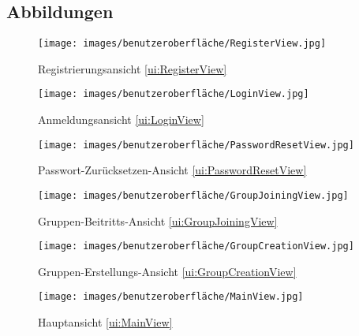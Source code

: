 \documentclass[parskip=full]{scrartcl}
\begin{document}
\subsection*{Abbildungen}
\begin{figure}[htp]
    \begin{minipage}
        [t]{0.49\textwidth}
        \centering
        \texttt{[image: images/benutzeroberfläche/RegisterView.jpg]}
        \caption{Registrierungsansicht \ref{ui:RegisterView}}
        \label{fig:RegisterView}
    \end{minipage}
    \begin{minipage}
        [t]{0.49\textwidth}
        \centering
        \texttt{[image: images/benutzeroberfläche/LoginView.jpg]}
        \caption{Anmeldungsansicht \ref{ui:LoginView}}
        \label{fig:LoginView}
    \end{minipage}
\end{figure}
\begin{figure}[htp]
    \begin{minipage}
        [t]{0.49\textwidth}
        \centering
        \texttt{[image: images/benutzeroberfläche/PasswordResetView.jpg]}
        \caption{Passwort-Zurücksetzen-Ansicht \ref{ui:PasswordResetView}}
        \label{fig:PasswordResetView}
    \end{minipage}
    \begin{minipage}
        [t]{0.49\textwidth}
        \centering
        \texttt{[image: images/benutzeroberfläche/GroupJoiningView.jpg]}
        \caption{Gruppen-Beitritts-Ansicht \ref{ui:GroupJoiningView}}
        \label{fig:GroupJoiningView}
    \end{minipage}
\end{figure}
\begin{figure}[htp]
    \begin{minipage}
        [t]{0.49\textwidth}
        \centering
        \texttt{[image: images/benutzeroberfläche/GroupCreationView.jpg]}
        \caption{Gruppen-Erstellungs-Ansicht \ref{ui:GroupCreationView}}
        \label{fig:GroupCreationView}
    \end{minipage}
    \begin{minipage}
        [t]{0.49\textwidth}
        \centering
        \texttt{[image: images/benutzeroberfläche/MainView.jpg]}
        \caption{Hauptansicht \ref{ui:MainView}}
        \label{fig:MainView}
    \end{minipage}
\end{figure}
\end{document}
